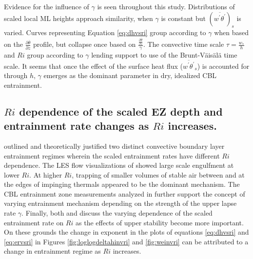 Evidence for the influence of $\gamma$ is seen throughout this study.  Distributions of scaled local ML heights approach similarity, when $\gamma$ is constant but $(\overline{w^{'}\theta^{'}})_{s}$ is varied.  Curves representing Equation \ref{eq:dhvsri} group according to $\gamma$ when based on the $\frac{\partial \overline{\theta}}{\partial z}$ profile, but collapse once based on $\frac{\frac{\partial \overline{\theta}}{\partial z}}{\gamma}$.  The convective time scale $\tau = \frac{w_{*}}{h}$ and $Ri$ group according to $\gamma$ lending support to \cite{FedConzMir04} use of the Brunt-V{\"a}is{\"a}l{\"a} time scale.  It seems that once the effect of the surface heat flux ($\overline{w^{'}\theta^{'}}_{s}$) is accounted for through $h$, $\gamma$ emerges as the dominant parameter in dry, idealized CBL entrainment.\\
 
\subsection{$Ri$ dependence of the scaled EZ depth and entrainment rate changes as $Ri$ increases.}

\cite{Turner86} outlined and theoretically justified two distinct convective boundary layer entrainment regimes wherein the scaled entrainment rates have different $Ri$ dependence. The LES flow visualizations of \cite{SullMoengStev} showed large scale engulfment at lower $Ri$.  At higher $Ri$, trapping of smaller volumes of stable air between and at the edges of impinging thermals appeared to be the dominant mechanism. The CBL entrainment zone measurements analyzed in \cite{Traum11} further support the concept of varying entrainment mechanism depending on the strength of the upper lapse rate $\gamma$.  Finally, both \cite{FedConzMir04} and \cite{GarciaMellado} discuss the varying dependence of the scaled entrainment rate on $Ri$ as the effects of upper stability become more important.  On these grounds the change in exponent in the plots of equations \ref{eq:dhvsri} and \ref{eq:ervsri} in Figures \ref{fig:loglogdeltahinvri} and \ref{fig:weinvri} can be attributed to a change in entrainment regime as $Ri$ increases.   



